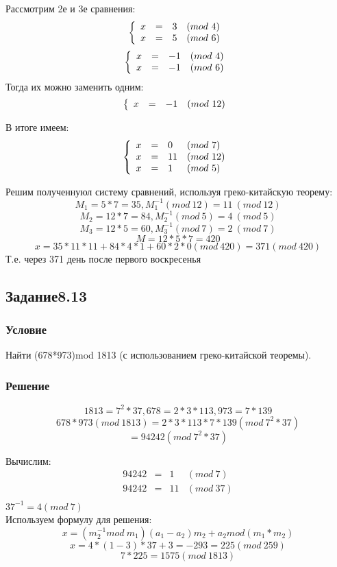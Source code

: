 \documentclass[10pt,a4paper]{article}
\begin{document}
Рассмотрим 2е и 3е сравнения:
\[
\left\{ \begin{array}{llll}
x & = &3 &(mod\ 4)\\
x & = &5 &(mod\ 6)\\
\end{array}
\right. \\
\]
\[
\left\{ \begin{array}{llll}
x & = &-1 &(mod\ 4)\\
x & = &-1 &(mod\ 6)\\
\end{array}
\right. \\
\]
Тогда их можно заменить одним:
\[
\left\{ \begin{array}{llll}
x & = &-1 &(mod\ 12)\\
\end{array}
\right. \\
\]

В итоге имеем:
\[
\left\{ \begin{array}{llll}
x& = &0 &(mod\ 7)\\
x & = &11 &(mod\ 12)\\
x & = &1 &(mod\ 5)\\
\end{array}
\right. \\
\]

Решим полученнуюл систему сравнений, используя греко-китайскую
теорему:
$$ M_1 = 5 * 7 = 35, M_1^{-1} (mod\ 12) = 11\ (mod\ 12) $$
$$ M_2 = 12 * 7 = 84, M_2^{-1} (mod\ 5) = 4\ (mod\ 5) $$
$$ M_3 = 12 * 5 = 60, M_3^{-1} (mod\ 7) = 2\ (mod\ 7) $$
$$ M = 12 *5 * 7 = 420 $$
$$ x = 35*11*11 + 84*4*1 + 60*2*0 (mod\ 420) = 371 (mod\ 420) $$
Т.е. через 371 день после первого воскресенья


\subsection*{Задание8.13}
\subsubsection*{Условие}
Найти (678*973)mod 1813 (с использованием греко-китайской теоремы).
\subsubsection*{Решение}
$$ 1813 = 7^2 * 37, 678 = 2*3*113, 973 = 7*139 $$
$$ 678*973 (mod\ 1813)  = 2*3*113*7*139 (mod\ 7^2*37) $$
$$ = 94242 (mod\ 7^2*37) $$

Вычислим:
\[
\begin{array}{llll}
94242 & = & 1 &(mod\ 7)\\
94242 & = &11 &(mod\ 37)\\
\end{array}
\]
$ 37^{-1} = 4 (mod\ 7) $ \\
Используем формулу для решения:
$$ x = (m_2^{-1} mod\ m_1)(a_1 - a_2)m_2 + a_2 mod(m_1 * m_2) $$
$$ x = 4*(1 - 3)*37 + 3 =  -293 = 225 (mod\ 259) $$
$$ 7*225 = 1575 (mod\ 1813) $$
\end{document}
